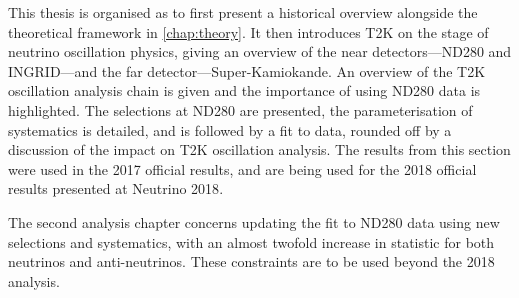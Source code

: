 This thesis is organised as to first present a historical overview alongside the theoretical framework in \autoref{chap:theory}. It then introduces T2K on the stage of neutrino oscillation physics, giving an overview of the near detectors---ND280 and INGRID---and the far detector---Super-Kamiokande. An overview of the T2K oscillation analysis chain is given and the importance of using ND280 data is highlighted. The selections at ND280 are presented, the parameterisation of systematics is detailed, and is followed by a fit to data, rounded off by a discussion of the impact on T2K oscillation analysis. The results from this section were used in the 2017 official results\cite{t2k_2017}, and are being used for the 2018 official results presented at Neutrino 2018\cite{t2k_neutrino2018}.

The second analysis chapter concerns updating the fit to ND280 data using new selections and systematics, with an almost twofold increase in statistic for both neutrinos and anti-neutrinos. These constraints are to be used beyond the 2018 analysis.
